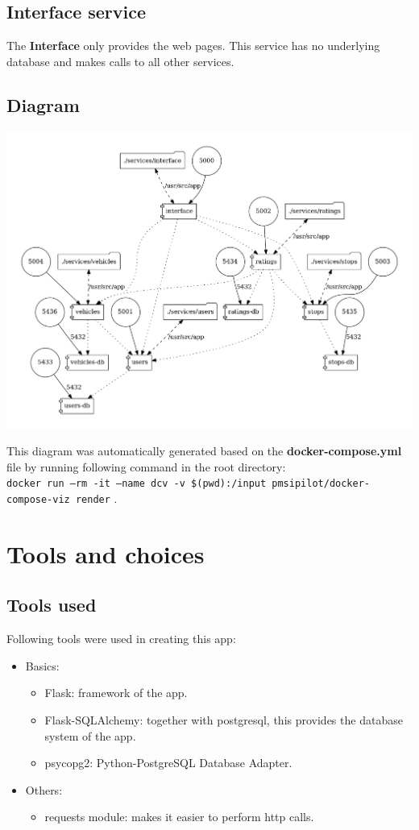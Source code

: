 \documentclass[12pt]{article}
\begin{document}
\subsection{Interface service}
The \textbf{Interface} only provides the web pages. This service has no underlying database and makes calls to all other services.

\subsection{Diagram}
\begin{center}
	\includegraphics[width=\linewidth]{Images/Architecture.png}
\end{center}
This diagram was automatically generated based on the \textbf{docker-compose.yml} file by running following command in the root directory:\\
\texttt{docker run --rm -it --name dcv -v \$(pwd):/input pmsipilot/docker-compose-viz render} .

\newpage

\section{Tools and choices}

\subsection{Tools used}
Following tools were used in creating this app:
\begin{itemize}
	\item Basics:
	\begin{itemize}
		\item Flask: framework of the app.
		\item Flask-SQLAlchemy: together with postgresql, this provides the database system of the app.
		\item psycopg2: Python-PostgreSQL Database Adapter.
	\end{itemize}
	\item Others:
	\begin{itemize}
		\item requests module: makes it easier to perform http calls.
	\end{itemize}
\end{itemize}
\end{document}
